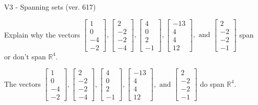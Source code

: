 \begin{exercise}
  \begin{exerciseTitle}V3 - Spanning sets (ver. 617)\end{exerciseTitle}
  \begin{exerciseStatement}
    Explain why the vectors \(\left[\begin{array}{r}
1 \\
0 \\
-4 \\
-2
\end{array}\right] , \left[\begin{array}{r}
2 \\
-2 \\
-2 \\
-4
\end{array}\right] , \left[\begin{array}{r}
4 \\
0 \\
2 \\
-1
\end{array}\right] , \left[\begin{array}{r}
-13 \\
4 \\
4 \\
12
\end{array}\right] , \text{ and } \left[\begin{array}{r}
2 \\
-2 \\
-2 \\
-1
\end{array}\right]\) span or don't span \(\mathbb{R}^4\). 
	


  \end{exerciseStatement}
  \begin{exerciseAnswer}
   The vectors \(\left[\begin{array}{r}
1 \\
0 \\
-4 \\
-2
\end{array}\right] , \left[\begin{array}{r}
2 \\
-2 \\
-2 \\
-4
\end{array}\right] , \left[\begin{array}{r}
4 \\
0 \\
2 \\
-1
\end{array}\right] , \left[\begin{array}{r}
-13 \\
4 \\
4 \\
12
\end{array}\right] , \text{ and } \left[\begin{array}{r}
2 \\
-2 \\
-2 \\
-1
\end{array}\right]\) 
  	 do  
	span \(\mathbb{R}^4\).
  



\end{exerciseAnswer}
\end{exercise}
